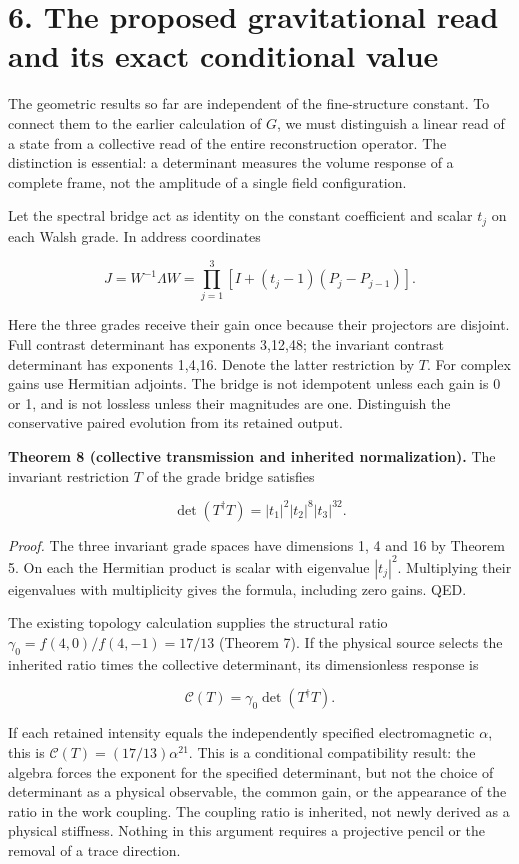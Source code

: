 \documentclass[
  11pt,
]{article}
\begin{document}
\section{6. The proposed gravitational read and its exact conditional
value}\label{the-proposed-gravitational-read-and-its-exact-conditional-value}

The geometric results so far are independent of the fine-structure
constant. To connect them to the earlier calculation of \(G\), we must
distinguish a linear read of a state from a collective read of the
entire reconstruction operator. The distinction is essential: a
determinant measures the volume response of a complete frame, not the
amplitude of a single field configuration.

Let the spectral bridge act as identity on the constant coefficient and
scalar \(t_j\) on each Walsh grade. In address coordinates

\[J=W^{-1}\Lambda W=\prod_{j=1}^3[I+(t_j-1)(P_j-P_{j-1})].\]

Here the three grades receive their gain once because their projectors
are disjoint. Full contrast determinant has exponents 3,12,48; the
invariant contrast determinant has exponents 1,4,16. Denote the latter
restriction by \(T\). For complex gains use Hermitian adjoints. The
bridge is not idempotent unless each gain is 0 or 1, and is not lossless
unless their magnitudes are one. Distinguish the conservative paired
evolution from its retained output.

\textbf{Theorem 8 (collective transmission and inherited
normalization).} The invariant restriction \(T\) of the grade bridge
satisfies

\[\det(T^\dagger T)=|t_1|^2|t_2|^8|t_3|^{32}.\]

\emph{Proof.} The three invariant grade spaces have dimensions 1, 4 and
16 by Theorem 5. On each the Hermitian product is scalar with eigenvalue
\(|t_j|^2\). Multiplying their eigenvalues with multiplicity gives the
formula, including zero gains. QED.

The existing topology calculation supplies the structural ratio
\(\gamma_0=f(4,0)/f(4,-1)=17/13\) (Theorem 7). If the physical source
selects the inherited ratio times the collective determinant, its
dimensionless response is

\[\mathcal C(T)=\gamma_0\det(T^\dagger T).\]

If each retained intensity equals the independently specified
electromagnetic \(\alpha\), this is
\(\mathcal C(T)=(17/13)\alpha^{21}\). This is a conditional
compatibility result: the algebra forces the exponent for the specified
determinant, but not the choice of determinant as a physical observable,
the common gain, or the appearance of the ratio in the work coupling.
The coupling ratio is inherited, not newly derived as a physical
stiffness. Nothing in this argument requires a projective pencil or the
removal of a trace direction.
\end{document}
